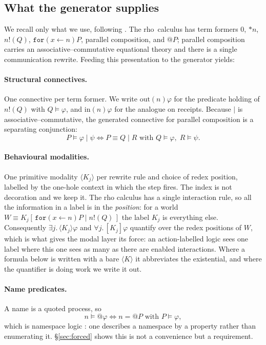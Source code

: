 \documentclass[11pt]{article}
\theoremstyle{plain}
\theoremstyle{definition}
\newcommand{\rhoc}{\textsf{rho}}
\begin{document}
\subsection{What the generator supplies}

We recall only what we use, following \cite[\S2]{ClassifierNote}. The \rhoc\ calculus has term formers
$0$, $\ast n$, $n!(Q)$, $\texttt{for}(x \leftarrow n)P$, parallel composition, and $@P$; parallel
composition carries an associative--commutative equational theory and there is a single communication
rewrite. Feeding this presentation to the generator yields:

\paragraph{Structural connectives.} One connective per term former. We write $\mathrm{out}(n)\varphi$
for the predicate holding of $n!(Q)$ with $Q \models \varphi$, and $\mathrm{in}(n)\varphi$ for the
analogue on receipts. Because $\mid$ is associative--commutative, the generated connective for
parallel composition is a separating conjunction:
\[
P \models \varphi \mid \psi \iff P \equiv Q \mid R \text{ with } Q \models \varphi,\; R \models \psi .
\]

\paragraph{Behavioural modalities.} One primitive modality $\langle K_j \rangle$ per rewrite rule and
choice of redex position, labelled by the one-hole context in which the step fires. The index is not
decoration and we keep it. The rho calculus has a single interaction rule, so all the information in
a label is in the \emph{position}: for a world $W \equiv K_j[\,\texttt{for}(x \leftarrow n)P \mid
n!(Q)\,]$ the label $K_j$ is everything else. Consequently $\exists j.\,\langle K_j\rangle\varphi$
and $\forall j.\,[K_j]\varphi$ quantify over the redex positions of $W$, which is what gives the
modal layer its force: an action-labelled logic sees one label where this one sees as many as there
are enabled interactions. Where a formula below is written with a bare $\langle K\rangle$ it
abbreviates the existential, and where the quantifier is doing work we write it out.

\paragraph{Name predicates.} A name is a quoted process, so
\[
n \models @\varphi \iff n = @P \text{ with } P \models \varphi ,
\]
which is namespace logic \cite{NamespaceLogic}: one describes a namespace by a property rather than
enumerating it. \S\ref{sec:forced} shows this is not a convenience but a requirement.
\end{document}
